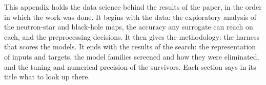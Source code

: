 \appendix

This appendix holds the data science behind the results of the paper, in the order in which the work was done. It begins with the data: the exploratory analysis of the neutron-star and black-hole maps, the accuracy any surrogate can reach on each, and the preprocessing decisions. It then gives the methodology: the harness that scores the models. It ends with the results of the search: the representation of inputs and targets, the model families screened and how they were eliminated, and the tuning and numerical precision of the survivors. Each section says in its title what to look up there.







